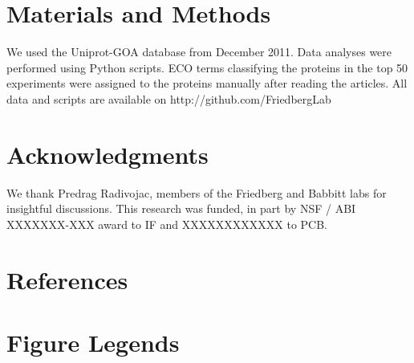 \documentclass[12pt]{article}
\begin{document}
\section*{Materials and Methods}
We used the Uniprot-GOA database from December 2011. Data analyses were performed using Python scripts.
ECO terms classifying the proteins in the top 50 experiments were assigned to the proteins
manually after reading the articles. All data and scripts are available on
http://github.com/FriedbergLab

\section*{Acknowledgments}
We thank Predrag Radivojac, members of the Friedberg and Babbitt labs for insightful discussions.
This research was funded, in part by NSF / ABI XXXXXXX-XXX award to IF and XXXXXXXXXXXX to PCB.

\section*{References}


\section*{Figure Legends}
\end{document}
